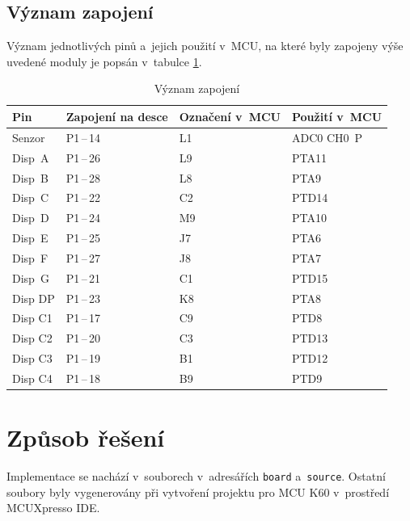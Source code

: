 \documentclass[a4paper, 11pt, twocolumn]{article}
\begin{document}
	\subsection{Význam zapojení}

	Význam jednotlivých pinů a~jejich použití v~MCU, na které byly zapojeny
	výše uvedené moduly je popsán v~tabulce \ref{tab:hardware_connection}.

	\begin{table}[ht]
		\centering
		\begin{tabular}{p{1.3cm} p{1.3cm} p{1.2cm} p{2.2cm}}
			\hline
			Pin & Zapojení na desce & Označení v~MCU & Použití v~MCU \\ \hline
			Senzor & P1\,--\,14 & L1 & ADC0 CH0~P \\
			Disp~A & P1\,--\,26 & L9 & PTA11 \\
			Disp~B & P1\,--\,28 & L8 & PTA9 \\
			Disp~C & P1\,--\,22 & C2 & PTD14 \\
			Disp~D & P1\,--\,24 & M9 & PTA10 \\
			Disp~E & P1\,--\,25 & J7 & PTA6 \\
			Disp~F & P1\,--\,27 & J8 & PTA7 \\
			Disp~G & P1\,--\,21 & C1 & PTD15 \\
			Disp DP & P1\,--\,23 & K8 & PTA8 \\
			Disp C1 & P1\,--\,17 & C9 & PTD8 \\
			Disp C2 & P1\,--\,20 & C3 & PTD13 \\
			Disp C3 & P1\,--\,19 & B1 & PTD12 \\
			Disp C4 & P1\,--\,18 & B9 & PTD9 \\ \hline
		\end{tabular}

		\caption{Význam zapojení}
		\label{tab:hardware_connection}
	\end{table}



	\section{Způsob řešení}

	Implementace se nachází v~souborech v~adresářích \texttt{board}
	a~\texttt{source}. Ostatní soubory byly vygenerovány při vytvoření
	projektu pro MCU K60 v~prostředí MCUXpresso IDE.
\end{document}
